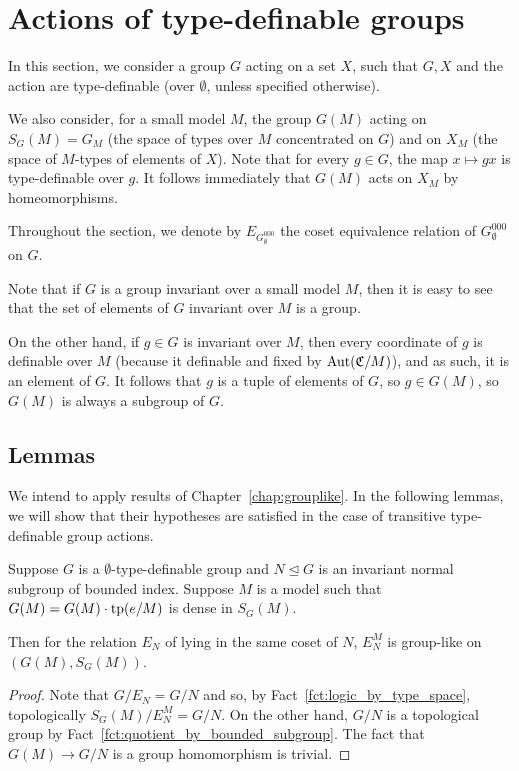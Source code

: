 	
	
	\section{Actions of type-definable groups}
	In this section, we consider a group $G$ acting on a set $X$, such that $G,X$ and the action are type-definable (over $\emptyset$, unless specified otherwise).
	
	We also consider, for a small model $M$, the group $G(M)$ acting on $S_G(M)=G_M$ (the space of types over $M$ concentrated on $G$) and on $X_M$ (the space of $M$-types of elements of $X$). Note that for every $g\in G$, the map $x\mapsto gx$ is type-definable over $g$. It follows immediately that $G(M)$ acts on $X_M$ by homeomorphisms.
	
	Throughout the section, we denote by $E_{G^{000}_\emptyset}$ the coset equivalence relation of $G^{000}_\emptyset$ on $G$.
	
	\begin{rem}
		Note that if $G$ is a group invariant over a small model $M$, then it is easy to see that the set of elements of $G$ invariant over $M$ is a group.
		
		On the other hand, if $g\in G$ is invariant over $M$, then every coordinate of $g$ is definable over $M$ (because it definable and fixed by $\operatorname{{Aut}}({\mathfrak C}/M)$), and as such, it is an element of $G$. It follows that $g$ is a tuple of elements of $G$, so $g\in G(M)$, so $G(M)$ is always a subgroup of $G$.\xqed{\lozenge}
	\end{rem}
	
	
	\subsection*{Lemmas}
	We intend to apply results of Chapter~\ref{chap:grouplike}. In the following lemmas, we will show that their hypotheses are satisfied in the case of transitive type-definable group actions.
	
	\begin{lem}
		\label{lem:quot_by_normal_grouplike}
		Suppose $G$ is a $\emptyset$-type-definable group and $N\unlhd G$ is an invariant normal subgroup of bounded index. Suppose $M$ is a model such that $G(M)=G(M)\cdot \operatorname{{tp}}(e/M)$ is dense in $S_G(M)$.
		
		Then for the relation $E_N$ of lying in the same coset of $N$, $E_N^M$ is group-like on $(G(M),S_G(M))$.
	\end{lem}
	\begin{proof}
		Note that $G/E_N=G/N$ and so, by Fact~\ref{fct:logic_by_type_space}, topologically $S_G(M)/E_N^M=G/N$. On the other hand, $G/N$ is a topological group by Fact~\ref{fct:quotient_by_bounded_subgroup}. The fact that $G(M)\to G/N$ is a group homomorphism is trivial.
	\end{proof}
	
